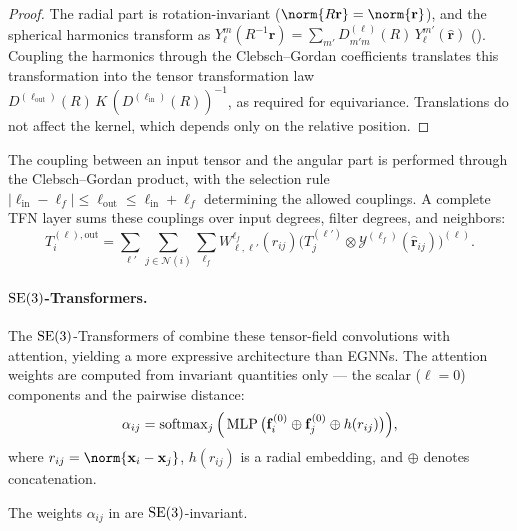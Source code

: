 \begin{proof}
The radial part is rotation-invariant ($\norm{R\mathbf{r}} = \norm{\mathbf{r}}$),
and the spherical harmonics transform as $Y_\ell^m(R^{-1}\hat{\mathbf{r}}) =
\sum_{m'} D^{(\ell)}_{m'm}(R)\, Y_\ell^{m'}(\hat{\mathbf{r}})$
(). Coupling the harmonics through the
Clebsch--Gordan coefficients translates this transformation into the tensor
transformation law $D^{(\ell_{\text{out}})}(R)\, K\,
(D^{(\ell_{\text{in}})}(R))^{-1}$, as required for equivariance. Translations do
not affect the kernel, which depends only on the relative position.
\end{proof}

The coupling between an input tensor and the angular part is performed through
the Clebsch--Gordan product, with the selection rule $|\ell_{\text{in}} -
\ell_f| \leq \ell_{\text{out}} \leq \ell_{\text{in}} + \ell_f$ determining the
allowed couplings. A complete TFN layer sums these couplings over input degrees,
filter degrees, and neighbors:
\begin{equation}
  T_i^{(\ell), \text{out}}
  = \sum_{\ell'} \sum_{j \in \mathcal{N}(i)} \sum_{\ell_f}
    W^{\ell_f}_{\ell, \ell'}(r_{ij})
    \big(T_j^{(\ell')} \otimes \mathcal{Y}^{(\ell_f)}(\hat{\mathbf{r}}_{ij})
    \big)^{(\ell)}.
\end{equation}

\paragraph{$\operatorname{SE}(3)$-Transformers.}
The $\operatorname{SE}(3)$-Transformers of \citet{fuchs2020se3transformers} combine these
tensor-field convolutions with attention, yielding a more expressive
architecture than EGNNs. The attention weights are computed from invariant
quantities only --- the scalar ($\ell = 0$) components and the pairwise distance:
\begin{equation}
  \alpha_{ij} = \operatorname{softmax}_j\Big(\operatorname{MLP}\big(\mathbf{f}_i^{(0)} \oplus
    \mathbf{f}_j^{(0)} \oplus h(r_{ij})\big)\Big),
  \label{eq:groups:se3-attention}
\end{equation}
where $r_{ij} = \norm{\mathbf{x}_i - \mathbf{x}_j}$, $h(r_{ij})$ is a radial
embedding, and $\oplus$ denotes concatenation.

\begin{proposition}
\label{prop:groups:se3-attention-invariance}
The weights $\alpha_{ij}$ in  are
$\operatorname{SE}(3)$-invariant.
\end{proposition}

